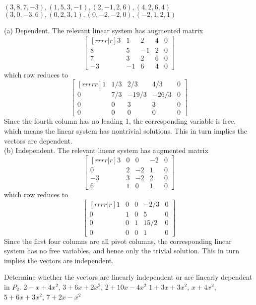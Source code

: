 \bb
\ii $(3,8,7,-3), (1,5,3,-1), (2,-1,2,6), (4,2,6,4)$
\ii $(3,0,-3,6), (0,2,3,1), (0,-2,-2,0), (-2,1,2,1)$
\ee
\begin{solution}
\noindent 
(a)  Dependent. The relevant linear system has augmented matrix 
\[
\begin{bmatrix}[rrrr|r]
3&1&2&4&0\\
8&5&-1&2&0\\
7&3&2&6&0\\
-3&-1&6&4&0
\end{bmatrix}
\]
which row reduces to 
\[
\begin{bmatrix}[rrrrr]
1&1/3&2/3&4/3&0\\
0&7/3&-19/3&-26/3&0\\
0&0&3&3&0\\
0&0&0&0&0
\end{bmatrix}
\]
Since the fourth column has no leading 1, the corresponding variable is free, which means the linear system has nontrivial solutions. This in turn implies the vectors are dependent. 
\\ (b) Independent. The relevant linear system has augmented matrix 
\[
\begin{bmatrix}[rrrr|r]
3&0&0&-2&0\\
0&2&-2&1&0\\
-3&3&-2&2&0\\
6&1&0&1&0
\end{bmatrix}
\]
which row reduces to 
\[
\begin{bmatrix}[rrrr|r]
1&0&0&-2/3&0\\
0&1&0&5&0\\
0&0&1&15/2&0\\
0&0&0&1&0
\end{bmatrix}
\]
Since the first four columns are all pivot columns, the corresponding linear system has no free variables, and hence only the trivial solution. This in turn implies the vectors are independent.
\end{solution}
\ii Determine whether the vectors are linearly independent or are linearly dependent in $P_2$.
\bb
\ii $2-x+4x^2$, $3+6x+2x^2$, $2+10x-4x^2$
\ii $1+3x+3x^2$, $x+4x^2$, $5+6x+3x^2$, $7+2x-x^2$

